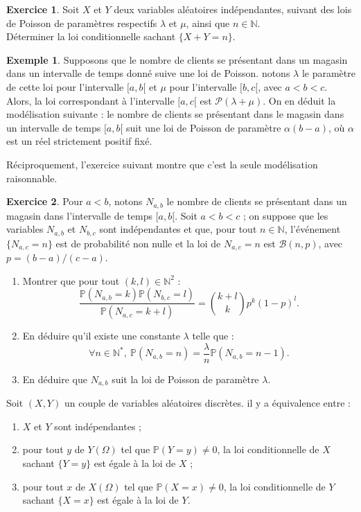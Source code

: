 \documentclass[french]{article}
\renewcommand{\P}{\mathbb{P}}
\newcommand{\N}{\mathbb{N}}
\newcommand{\st}{^*}
\theoremstyle{plain}
\theoremstyle{definition}
\newtheorem*{ex}{Exemple}
\newtheorem{exo}{Exercice}
\theoremstyle{remark}
\begin{document}
\begin{exo}
	Soit $X$ et $Y$ deux variables aléatoires indépendantes, suivant des lois de Poisson de paramètres respectifs $\lambda$ et $\mu$, ainsi que $n\in\N$.\\
	Déterminer la loi conditionnelle sachant $\{X+Y=n\}$.
\end{exo}

\begin{ex}
	Supposons que le nombre de clients se présentant dans un magasin dans un intervalle de temps donné suive une loi de Poisson. notons $\lambda$ le paramètre de cette loi pour l'intervalle $[a,b[$ et $\mu$ pour l'intervalle $[b,c[$, avec $a<b<c$. Alors, la loi correspondant à l'intervalle $[a,c[$ est $\mathcal{P}(\lambda+\mu)$. On en déduit la modélisation suivante : le nombre de clients se présentant dans le magasin dans un intervalle de temps $[a,b[$ suit une loi de Poisson de paramètre $\alpha(b-a)$, où $\alpha$ est un réel strictement positif fixé.
\end{ex}

Réciproquement, l'exercice suivant montre que c'est la seule modélisation raisonnable.

\begin{exo}
	Pour $a<b$, notons $N_{a,b}$ le nombre de clients se présentant dans un magasin dans l'intervalle de temps $[a,b[$. Soit $a<b<c$ ; on suppose que les variables $N_{a,b}$ et $N_{b,c}$ sont indépendantes et que, pour tout $n\in\N$, l'événement $\{N_{a,c}=n\}$ est de probabilité non nulle et la loi de $N_{a,c}=n$ est $\mathcal{B}(n,p)$, avec $p=(b-a)/(c-a)$.
	\begin{enumerate}
		\item Montrer que pour tout $(k,l)\in\N^2$ : 
		$$\frac{\P(N_{a,b}=k)\P(N_{b,c}=l)}{\P(N_{a,c}=k+l)}=\binom{k+l}{k}p^k(1-p)^l.$$
		\item En déduire qu'il existe une constante $\lambda$ telle que :
		$$\forall n\in\N\st,\ \P(N_{a,b}=n)=\frac{\lambda}{n}\P(N_{a,b}=n-1).$$
		\item En déduire que $N_{a,b}$ suit la loi de Poisson de paramètre $\lambda$.
	\end{enumerate}
\end{exo}

\begin{thm}{}%
	Soit $(X,Y)$ un couple de variables aléatoires discrètes. il y a équivalence entre :
	\begin{enumerate}[label=(\roman*)]
		\item $X$ et $Y$ sont indépendantes ;
		\item pour tout $y$ de $Y(\Omega)$ tel que $\P(Y=y)\ne0$, la loi conditionnelle de $X$ sachant $\{Y=y\}$ est égale à la loi de $X$ ;
		\item pour tout $x$ de $X(\Omega)$ tel que $\P(X=x)\ne0$, la loi conditionnelle de $Y$ sachant $\{X=x\}$ est égale à la loi de $Y$.
	\end{enumerate}
\end{thm}
\end{document}
